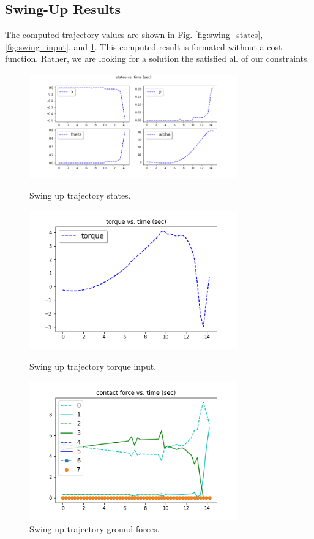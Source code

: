 \documentclass[conference]{IEEEtran}
\begin{document}
\subsection{Swing-Up Results}
The computed trajectory values are shown in Fig. \ref{fig:swing_states}, \ref{fig:swing_input}, and \ref{fig:swing_ground}. This computed result is formated without a cost function. Rather, we are looking for a solution the satisfied all of our constraints.

\begin{figure}[htbp]
\centerline{\includegraphics[width=9cm,keepaspectratio]{media/swing_up/swing_up_states.png}}
\caption{Swing up trajectory states.}
\label{fig:swing_states}
\centerline{\includegraphics[width=9cm,keepaspectratio]{media/swing_up/swing_up_torque.png}}
\caption{Swing up trajectory torque input.}
\label{fig:swing_input}
\centerline{\includegraphics[width=9cm,keepaspectratio]{media/swing_up/swing_up_ground_forces.png}}
\caption{Swing up trajectory ground forces.}
\label{fig:swing_ground}
\end{figure}
\end{document}
